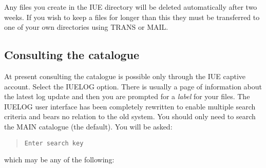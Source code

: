 Any files you create in the IUE directory will be deleted automatically after
two weeks.
If you wish to keep a files for longer than this they must be transferred to 
one of your own directories using TRANS or MAIL.

\subsection {Consulting the catalogue}

At present consulting the catalogue is possible only through the IUE 
captive account. Select the IUELOG option. 
There is usually a page of information about the latest log update and then
you are prompted for a {\it label} for your files.
The IUELOG user interface has been completely rewritten to enable multiple 
search criteria and bears no relation to the old system.
You should only need to search the MAIN catalogue (the default).
You will be asked:

\begin{quote}
{\tt Enter search key}
\end{quote}

which may be any of the following:

